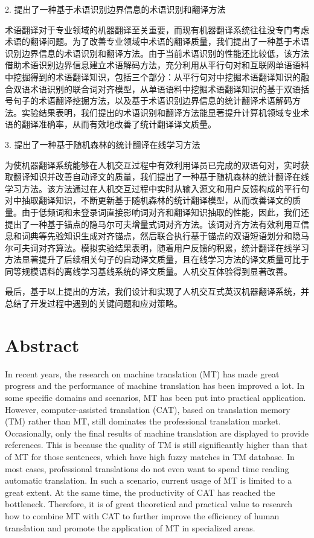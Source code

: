 2. 提出了一种基于术语识别边界信息的术语识别和翻译方法

术语翻译对于专业领域的机器翻译至关重要，而现有机器翻译系统往往没专门考虑术语的翻译问题。为了改善专业领域中术语的翻译质量，我们提出了一种基于术语识别边界信息的术语识别和翻译方法。由于当前术语识别的性能还比较低，该方法借助术语识别边界信息建立术语解码方法，充分利用从平行句对和互联网单语语料中挖掘得到的术语翻译知识，包括三个部分：从平行句对中挖掘术语翻译知识的融合双语术语识别的联合词对齐模型，从单语语料中挖掘术语翻译知识的基于双语括号句子的术语翻译挖掘方法，以及基于术语识别边界信息的统计翻译术语解码方法。实验结果表明，我们提出的术语识别和翻译方法能显著提升计算机领域专业术语的翻译准确率，从而有效地改善了统计翻译译文质量。

3. 提出了一种基于随机森林的统计翻译在线学习方法

为使机器翻译系统能够在人机交互过程中有效利用译员已完成的双语句对，实时获取翻译知识并改善自动译文的质量，我们提出了一种基于随机森林的统计翻译在线学习方法。该方法通过在人机交互过程中实时从输入源文和用户反馈构成的平行句对中抽取翻译知识，不断更新基于随机森林的统计翻译模型，从而改善译文的质量。由于低频词和未登录词直接影响词对齐和翻译知识抽取的性能，因此，我们还提出了一种基于锚点的隐马尔可夫增量式词对齐方法。该词对齐方法有效利用互信息和词典等先验知识生成对齐锚点，然后联合执行基于锚点的双语短语划分和隐马尔可夫词对齐算法。模拟实验结果表明，随着用户反馈的积累，统计翻译在线学习方法显著提升了后续相关句子的自动译文质量，且在线学习方法的译文质量可比于同等规模语料的离线学习基线系统的译文质量。人机交互体验得到显著改善。

最后，基于以上提出的方法，我们设计和实现了人机交互式英汉机器翻译系统，并总结了开发过程中遇到的关键问题和应对策略。



\chapter{Abstract}%
In recent years, the research on machine translation (MT) has made great progress and the performance of machine translation has been improved a lot. In some specific domains and scenarios, MT has been put into practical application. However, computer-assisted translation (CAT), based on translation memory (TM) rather than MT, still dominates the professional translation market. Occasionally, only the final results of machine translation are displayed to provide references. This is because the quality of TM is still significantly higher than that of MT for those sentences, which have high fuzzy matches in TM database. In most cases, professional translations do not even want to spend time reading automatic translation. In such a scenario, current usage of MT is limited to a great extent. At the same time, the productivity of CAT has reached the bottleneck. Therefore, it is of great theoretical and practical value to research how to combine MT with CAT to further improve the efficiency of human translation and promote the application of MT in specialized areas.

